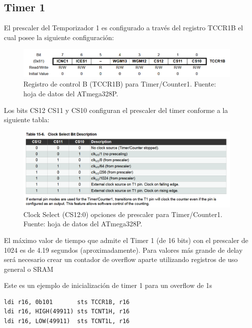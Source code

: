 \subsection{Timer 1}

El prescaler del Temporizador 1 es configurado a través del registro TCCR1B el cual posee la siguiente configuración:

\begin{figure}[H]
  \centering
  \includegraphics[width=\linewidth]{./Anexos/Marco Teorico/Timers/TCCR1B.png}
  \caption{Registro de control B (TCCR1B) para Timer/Counter1. Fuente: hoja de datos del ATmega328P\@\cite{atmega328p_datasheet}.}
  \label{fig:TCCR1B}
\end{figure}

Los bits CS12 CS11 y CS10 configuran el prescaler del timer conforme a la siguiente tabla: 

\begin{figure}[H]
  \centering
  \includegraphics[width=\linewidth]{./Anexos/Marco Teorico/Timers/Prescaler Table.png}
  \caption{Clock Select (CS12:0) opciones de prescaler para Timer/Counter1. Fuente: hoja de datos del ATmega328P\@\cite{atmega328p_datasheet}.}
  \label{fig:prescaler-table}
\end{figure}


El máximo valor de tiempo que admite el Timer 1 (de 16 bits) con el prescaler de 1024 es de 4.19 segundos (aproximadamente). Para valores más grande de delay será necesario crear un contador de overflow aparte utilizando registros de uso general o SRAM

Este es un ejemplo de inicialización de timer 1 para un overflow de 1s

\begin{verbatim}
ldi r16, 0b101       sts TCCR1B, r16
ldi r16, HIGH(49911) sts TCNT1H, r16
ldi r16, LOW(49911)  sts TCNT1L, r16 
\end{verbatim}

